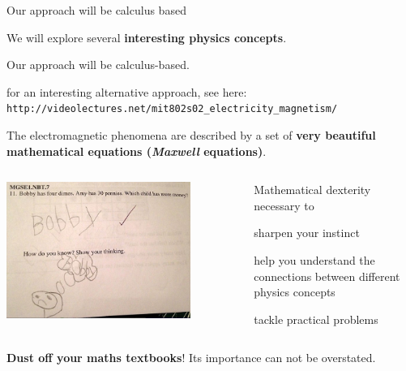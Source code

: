 %
%
%

\begin{frame}{Our approach will be calculus based}

\begin{itemize}
{
      \item We will explore several {\bf interesting physics concepts}.
      \item Our approach will be calculus-based.
      \begin{itemize}
      {
         \item for an interesting alternative approach, see here:\\
                    {\color{blue} \tt http://videolectures.net/mit802s02\_electricity\_magnetism/}
      }
      \end{itemize}
      \item The electromagnetic phenomena are described by a set of {\bf very beautiful
                mathematical equations ({\em Maxwell} equations)}.
}
\end{itemize}


\begin{columns}
  \begin{column}{0.45\textwidth}
   \begin{center}
     \includegraphics[width=0.80\textwidth]{./images/photos/bobby.png}\\
   \end{center}
  \end{column}
  \begin{column}{0.55\textwidth}
  {\small
         Mathematical dexterity necessary to
         \begin{itemize}
          { \small
                 \item sharpen your instinct
                 \item help you understand the connections between
                   different physics concepts
                  \item tackle practical problems
          }
         \end{itemize}
   }
  \end{column}
\end{columns}

\vspace{0.25cm}
{\bf Dust off your maths textbooks}! Its importance can not be overstated.\\

\end{frame}


